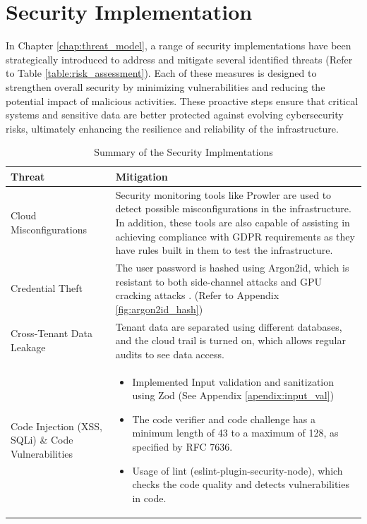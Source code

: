 \section{Security Implementation}
In Chapter \ref{chap:threat_model}, a range of security implementations have been strategically introduced to address and mitigate several identified threats (Refer to Table \ref{table:risk_assessment}). Each of these measures is designed to strengthen overall security by minimizing vulnerabilities and reducing the potential impact of malicious activities. These proactive steps ensure that critical systems and sensitive data are better protected against evolving cybersecurity risks, ultimately enhancing the resilience and reliability of the infrastructure. 

\begin{longtable}{|p{5cm}|p{10cm}|}
    \caption{Summary of the Security Implmentations}
    \label{table:sec_impl}
\hline
\rowcolor{grey!15}
\textbf{Threat} & \textbf{Mitigation} \\
\hline
\endhead
\hline
\endfoot
Cloud Misconfigurations & Security monitoring tools like Prowler are used to detect possible misconfigurations in the infrastructure. In addition, these tools are also capable of assisting in achieving compliance with GDPR requirements as they have rules built in them to test the infrastructure.  \\
\hline
Credential Theft & The user password is hashed using Argon2id, which is resistant to both side-channel attacks and GPU cracking attacks \citep{argon2id}. (Refer to Appendix \ref{fig:argon2id_hash})  \\
\hline
Cross-Tenant Data Leakage & Tenant data are separated using different databases, and the cloud trail is turned on, which allows regular audits to see data access. \\
\hline
Code Injection (XSS, SQLi) \& Code Vulnerabilities & \begin{itemize}
    \item Implemented Input validation and sanitization using Zod (See Appendix \ref{apendix:input_val})
    \item The code verifier and code challenge has a minimum length of 43 to a maximum of 128, as specified by RFC 7636.
    \item Usage of lint (eslint-plugin-security-node), which checks the code quality and detects vulnerabilities in code.
    

\end{itemize}
\end{longtable}
